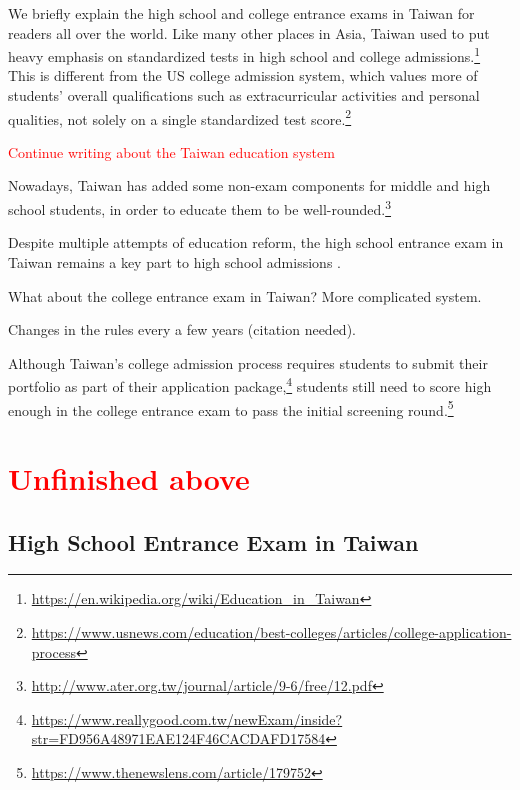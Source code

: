 \documentclass[
]{article}
\begin{document}
We briefly explain the high school and college entrance exams in Taiwan
for readers all over the world. Like many other places in Asia, Taiwan
used to put heavy emphasis on standardized tests in high school and
college admissions.\footnote{\url{https://en.wikipedia.org/wiki/Education_in_Taiwan}}
This is different from the US college admission system, which values
more of students' overall qualifications such as extracurricular
activities and personal qualities, not solely on a single standardized
test score.\footnote{\url{https://www.usnews.com/education/best-colleges/articles/college-application-process}}

\textcolor{red}{Continue writing about the Taiwan education system}

Nowadays, Taiwan has added some non-exam components for middle and high
school students, in order to educate them to be well-rounded.\footnote{\url{http://www.ater.org.tw/journal/article/9-6/free/12.pdf}}

Despite multiple attempts of education reform, the high school entrance
exam in Taiwan remains a key part to high school admissions
\citep{chen2017advancing, chen2008strategic}.

What about the college entrance exam in Taiwan? More complicated system.

Changes in the rules every a few years (citation needed).

Although Taiwan's college admission process requires students to submit
their portfolio as part of their application package,\footnote{\url{https://www.reallygood.com.tw/newExam/inside?str=FD956A48971EAE124F46CACDAFD17584}}
students still need to score high enough in the college entrance exam to
pass the initial screening round.\footnote{\url{https://www.thenewslens.com/article/179752}}

\section*{\textcolor{red}{Unfinished above}}

\hypertarget{HighSchool_PR}{%
\subsection{High School Entrance Exam in Taiwan}\label{HighSchool_PR}}
\end{document}

